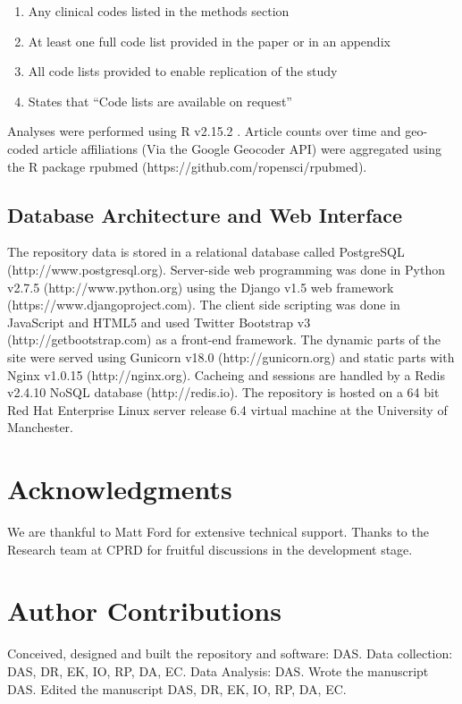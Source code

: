 \documentclass[10pt]{article}
\begin{document}
\begin{enumerate}
    \item Any clinical codes listed in the methods section
    \item At least one full code list provided in the paper or in an appendix
    \item All code lists provided to enable replication of the study
    \item States that ``Code lists are available on request'' 
\end{enumerate}

Analyses were performed using R v2.15.2 \cite{R2012}. Article counts over time and geo-coded article affiliations (Via the Google Geocoder API) were aggregated using the R package rpubmed (https://github.com\slash ropensci/rpubmed).

\subsection*{Database Architecture and Web Interface}

The repository data is stored in a relational database called PostgreSQL (http://www.postgresql.org). Server-side web programming was done in Python v2.7.5 (http://www.python.org) using the Django v1.5 web framework (https://www.djangoproject.com). The client side scripting was done in JavaScript and HTML5 and used Twitter Bootstrap v3 (http://getbootstrap.com) as a front-end framework.  The dynamic parts of the site were served using Gunicorn v18.0 (http://gunicorn.org) and static parts with Nginx v1.0.15 (http://nginx.org). Cacheing and sessions are handled by a Redis v2.4.10 NoSQL database (http://redis.io). The repository is hosted on a 64 bit Red Hat Enterprise Linux server release 6.4 virtual machine at the University of Manchester. 


\section*{Acknowledgments}
We are thankful to Matt Ford for extensive technical support. Thanks to the Research team at CPRD for fruitful discussions in the development stage.

\section*{Author Contributions}

Conceived, designed and built the repository and software: DAS. Data collection: DAS, DR, EK, IO, RP, DA, EC.  Data Analysis: DAS. Wrote the manuscript DAS. Edited the manuscript DAS, DR, EK, IO, RP, DA, EC.
\end{document}
